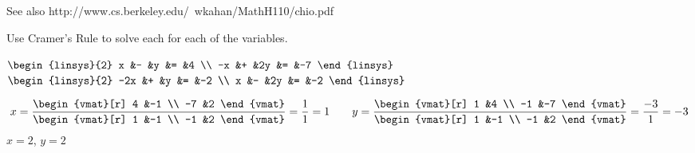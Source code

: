 See also http://www.cs.berkeley.edu/~wkahan/MathH110/chio.pdf
\begin{exercises}
  \item 
    Use Cramer's Rule to solve each for each of the variables.
    \begin{exparts*}
      \partsitem $\begin{linsys}{2}
                    x  &- &y  &=  &4  \\
                   -x  &+ &2y &=  &-7
                  \end{linsys}$
      \partsitem $\begin{linsys}{2}
                    -2x  &+  &y  &=  &-2 \\
                      x  &-  &2y &=  &-2  
                  \end{linsys}$
    \end{exparts*}
    \begin{answer}
      \begin{exparts*}
        \partsitem 
          \begin{equation*}
            x=
             \frac{ \begin{vmat}[r]
                       4  &-1  \\
                      -7  &2   
                    \end{vmat}  }{
                    \begin{vmat}[r]
                       1  &-1  \\
                      -1  &2 
                    \end{vmat}  }
            =\frac{1}{1}=1
            \qquad
            y=
             \frac{ \begin{vmat}[r]
                       1  &4  \\
                      -1  &-7   
                    \end{vmat}  }{
                    \begin{vmat}[r]
                       1  &-1  \\
                      -1  &2 
                    \end{vmat}  }
            =\frac{-3}{1}=-3
          \end{equation*}
        \partsitem $x=2$, $y=2$
      \end{exparts*} 
    \end{answer}
\end{exercises}
\endinput
